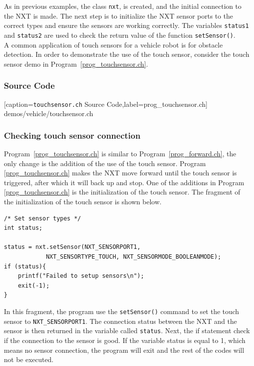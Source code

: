 \documentclass[11pt]{article}
\begin{document}
As in previous examples, the class {\tt nxt}, is created, and the initial 
connection to the NXT is made. The next step is to initialize the NXT sensor 
ports to the correct types and ensure the sensors are working correctly. The 
variables {\tt status1} and {\tt status2} are used to check the return value 
of the function {\tt setSensor()}.\\

A common application of touch sensors for a vehicle robot is for obstacle 
detection. In order to demonstrate the use of the touch sensor, consider the 
touch sensor demo in Program~\ref{prog_touchsensor.ch}.
\subsubsection*{Source Code}

[caption={{\tt touchsensor.ch} Source Code},label=prog_touchsensor.ch]
{demos/vehicle/touchsensor.ch}
\subsubsection*{Checking touch sensor connection}
Program~\ref{prog_touchsensor.ch} is similar to Program~\ref{prog_forward.ch}, 
the only change is the addition of the use of the touch sensor. Program~
\ref{prog_touchsensor.ch} makes the NXT move forward until the touch sensor is 
triggered, after which it will back up and stop. One of the additions in Program~
\ref{prog_touchsensor.ch} is the initialization of the touch sensor. The fragment 
of the initialization of the touch sensor is shown below.
\begin{lstlisting}
/* Set sensor types */
int status;

status = nxt.setSensor(NXT_SENSORPORT1, 
            NXT_SENSORTYPE_TOUCH, NXT_SENSORMODE_BOOLEANMODE);
if (status){
    printf("Failed to setup sensors\n");
    exit(-1);
}
\end{lstlisting}
In this fragment, the program use the {\tt setSensor()} command to set the touch 
sensor to {\tt NXT\_SENSORPORT1}. The connection status between the NXT and the 
sensor is then returned in the variable called {\tt status}. Next, the if statement 
check if the connection to the sensor is good. If the variable status is equal to 1, 
which means no sensor connection, the program will exit and the rest of the codes 
will not be executed.
 
\end{document}
